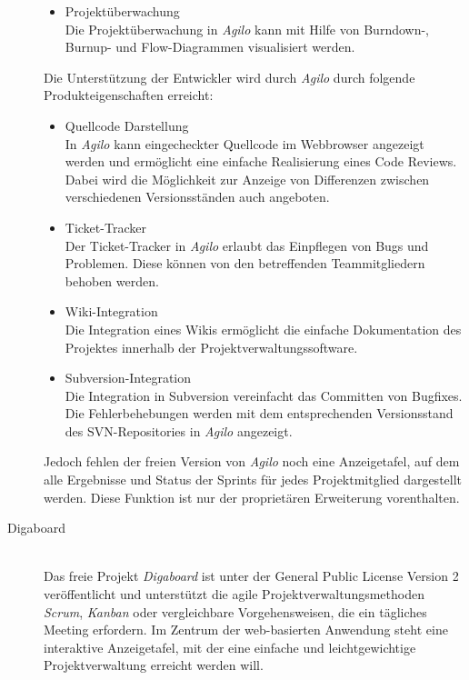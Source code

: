 \begin{description}
\begin{itemize}
\item Projektüberwachung\\
Die Projektüberwachung in \emph{Agilo} kann mit Hilfe von Burndown-, Burnup- und Flow-Diagrammen visualisiert werden.

\end{itemize}

Die Unterstützung der Entwickler wird durch \emph{Agilo} durch folgende Produkteigenschaften erreicht:
\begin{itemize}
\item Quellcode Darstellung\\
In \emph{Agilo} kann eingecheckter Quellcode im Webbrowser angezeigt werden und ermöglicht eine einfache Realisierung eines Code Reviews. Dabei wird die Möglichkeit zur Anzeige von Differenzen zwischen verschiedenen Versionsständen auch angeboten. 

\item Ticket-Tracker\\
Der Ticket-Tracker in \emph{Agilo} erlaubt das Einpflegen von Bugs und Problemen. Diese können von den betreffenden Teammitgliedern behoben werden.

\item Wiki-Integration\\
Die Integration eines Wikis ermöglicht die einfache Dokumentation des Projektes innerhalb der Projektverwaltungssoftware.

\item Subversion-Integration\\
Die Integration in Subversion vereinfacht das Committen von Bugfixes. Die Fehlerbehebungen werden mit dem entsprechenden Versionsstand des SVN-Repositories in \emph{Agilo} angezeigt.
\end{itemize}

Jedoch fehlen der freien Version von \emph{Agilo} noch eine Anzeigetafel, auf dem alle Ergebnisse und Status der Sprints für jedes Projektmitglied dargestellt werden. Diese Funktion ist nur der proprietären Erweiterung vorenthalten. \cite{bib:agilo} \\

\item[Digaboard]\hspace*{1em}\\
Das freie Projekt \emph{Digaboard} ist unter der General Public License Version 2 veröffentlicht und unterstützt die agile Projektverwaltungsmethoden \emph{Scrum}, \emph{Kanban} oder vergleichbare Vorgehensweisen, die ein tägliches Meeting erfordern. Im Zentrum der web-basierten Anwendung steht eine interaktive Anzeigetafel, mit der eine einfache und leichtgewichtige Projektverwaltung erreicht werden will.


\end{description}
